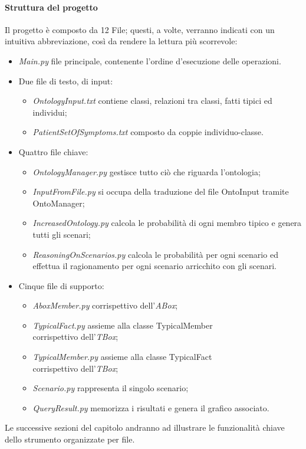 \paragraph{Struttura del progetto}
Il progetto è composto da 12 File; questi, a volte, verranno indicati con un intuitiva abbreviazione, 
così da rendere la lettura più scorrevole:
\begin{itemize}
	\item \emph{Main.py} file principale, contenente l'ordine d'esecuzione delle operazioni.
	\item Due file di testo, di input:
	\begin{itemize}
		\item \emph{OntologyInput.txt} contiene classi, relazioni tra classi, fatti tipici
			ed individui; 
		\item \emph{PatientSetOfSymptoms.txt} composto da coppie individuo-classe.
	\end{itemize}
	\item Quattro file chiave:
	\begin{itemize}
		\item \emph{OntologyManager.py} gestisce tutto ciò che riguarda l'ontologia;
		\item \emph{InputFromFile.py} si occupa della traduzione del file OntoInput tramite OntoManager;
		\item \emph{IncreasedOntology.py} calcola le probabilità di ogni membro tipico e genera tutti gli scenari;
		\item \emph{ReasoningOnScenarios.py} calcola le probabilità per ogni scenario ed effettua il ragionamento per ogni scenario arricchito con gli scenari.
	\end{itemize}
	\item Cinque file di supporto:
	\begin{itemize}
		\item \emph{AboxMember.py} corrispettivo dell'\textit{ABox};
		\item \emph{TypicalFact.py} assieme alla classe TypicalMember\\ corrispettivo dell'\textit{TBox};
		\item \emph{TypicalMember.py} assieme alla classe TypicalFact\\ corrispettivo dell'\textit{TBox};
		\item \emph{Scenario.py} rappresenta il singolo scenario;
		\item \emph{QueryResult.py} memorizza i risultati e genera il grafico associato.
	\end{itemize}
\end{itemize}
Le successive sezioni del capitolo andranno ad illustrare le funzionalità chiave dello strumento organizzate per file.
